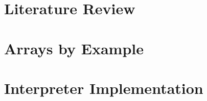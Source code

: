 \documentclass[12pt]{article}
\begin{document}

\clearpage

\tableofcontents
\clearpage


\clearpage

\section{Literature Review}
\clearpage

\section{Arrays by Example}
\clearpage


\clearpage


\clearpage

\section{Interpreter Implementation}
\clearpage

\printbibliography
\end{document}
